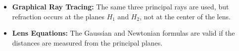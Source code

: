 \begin{itemize}
    \item \textbf{Graphical Ray Tracing:} The same three principal rays are used, but refraction occurs at the planes $H_1$ and $H_2$, not at the center of the lens.
    \item \textbf{Lens Equations:} The Gaussian and Newtonian formulas are valid if the distances are measured from the principal planes.
\end{itemize}

\noindent{}